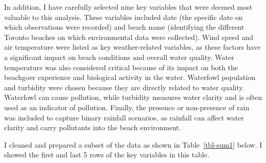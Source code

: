 \documentclass[
  letterpaper,
  DIV=11,
  numbers=noendperiod]{scrartcl}
\begin{document}
In addition, I have carefully selected nine key variables that were
deemed most valuable to this analysis. These variables included date
(the specific date on which observations were recorded) and beach name
(identifying the different Toronto beaches on which environmental data
were collected). Wind speed and air temperature were listed as key
weather-related variables, as these factors have a significant impact on
beach conditions and overall water quality. Water temperature was also
considered critical because of its impact on both the beachgoer
experience and biological activity in the water. Waterfowl population
and turbidity were chosen because they are directly related to water
quality. Waterfowl can cause pollution, while turbidity measures water
clarity and is often used as an indicator of pollution. Finally, the
presence or non-presence of rain was included to capture binary rainfall
scenarios, as rainfall can affect water clarity and carry pollutants
into the beach environment.

I cleaned and prepared a subset of the data as shown in
Table~\ref{tbl-sum1} below. I showed the first and last 5 rows of the
key variables in this table.
\end{document}
